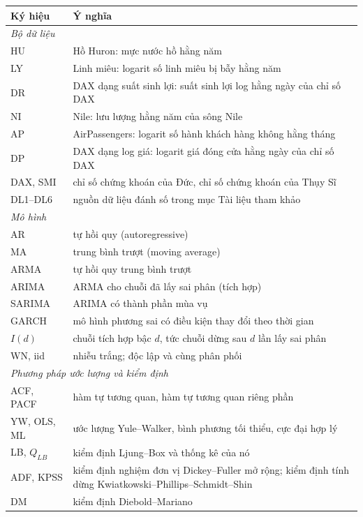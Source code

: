 \begin{center}
\small
\renewcommand{\arraystretch}{1.2}
\begin{tabular}{|p{2.6cm}|p{14.4cm}|}
\toprule
Ký hiệu & Ý nghĩa \\
\midrule
\multicolumn{2}{|l|}{\textit{Bộ dữ liệu}} \\
HU & Hồ Huron: mực nước hồ hằng năm \\
LY & Linh miêu: logarit số linh miêu bị bẫy hằng năm \\
DR & DAX dạng suất sinh lợi: suất sinh lợi log hằng ngày của chỉ số DAX \\
NI & Nile: lưu lượng hằng năm của sông Nile \\
AP & AirPassengers: logarit số hành khách hàng không hằng tháng \\
DP & DAX dạng log giá: logarit giá đóng cửa hằng ngày của chỉ số DAX \\
DAX, SMI & chỉ số chứng khoán của Đức, chỉ số chứng khoán của Thụy Sĩ \\
DL1--DL6 & nguồn dữ liệu đánh số trong mục Tài liệu tham khảo \\
\midrule
\multicolumn{2}{|l|}{\textit{Mô hình}} \\
AR & tự hồi quy (autoregressive) \\
MA & trung bình trượt (moving average) \\
ARMA & tự hồi quy trung bình trượt \\
ARIMA & ARMA cho chuỗi đã lấy sai phân (tích hợp) \\
SARIMA & ARIMA có thành phần mùa vụ \\
GARCH & mô hình phương sai có điều kiện thay đổi theo thời gian \\
$I(d)$ & chuỗi tích hợp bậc $d$, tức chuỗi dừng sau $d$ lần lấy sai phân \\
WN, iid & nhiễu trắng; độc lập và cùng phân phối \\
\midrule
\multicolumn{2}{|l|}{\textit{Phương pháp ước lượng và kiểm định}} \\
ACF, PACF & hàm tự tương quan, hàm tự tương quan riêng phần \\
YW, OLS, ML & ước lượng Yule--Walker, bình phương tối thiểu, cực đại hợp lý \\
LB, $Q_{LB}$ & kiểm định Ljung--Box và thống kê của nó \\
ADF, KPSS & kiểm định nghiệm đơn vị Dickey--Fuller mở rộng; kiểm định tính dừng Kwiatkowski--Phillips--Schmidt--Shin \\
DM & kiểm định Diebold--Mariano \\

\end{tabular}
\end{center}

